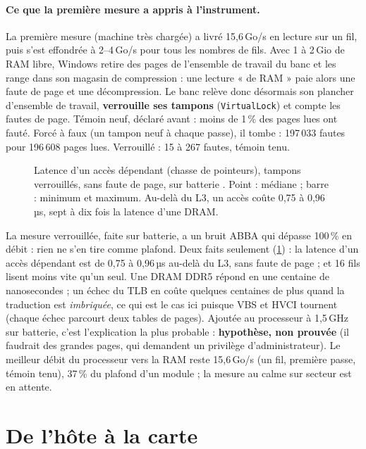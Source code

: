 \paragraph{Ce que la première mesure a appris à l'instrument.} La première mesure (machine très chargée) a livré 15,6\,Go/s en lecture sur un fil, puis s'est effondrée à 2--4\,Go/s pour tous les nombres de fils. Avec 1 à 2\,Gio de RAM libre, Windows retire des pages de l'ensemble de travail du banc et les range dans son magasin de compression : une lecture « de RAM » paie alors une faute de page et une décompression. Le banc relève donc désormais son plancher d'ensemble de travail, \textbf{verrouille ses tampons} (\texttt{VirtualLock}) et compte les fautes de page. Témoin neuf, déclaré avant : moins de 1\,\% des pages lues ont fauté. Forcé à faux (un tampon neuf à chaque passe), il tombe : 197\,033 fautes pour 196\,608 pages lues. Verrouillé : 15 à 267 fautes, témoin tenu.

\begin{figure}[ht]
\centering
\GrapheLatence
\caption[Latence d'un accès dépendant selon la taille du tampon]{Latence d'un accès dépendant (chasse de pointeurs), tampons verrouillés, sans faute de page, sur batterie \mes. Point : médiane ; barre : minimum et maximum. Au-delà du L3, un accès coûte 0,75 à 0,96\,µs, sept à dix fois la latence d'une DRAM.}
\label{fig:latence}
\end{figure}

La mesure verrouillée, faite sur batterie, a un bruit ABBA qui dépasse 100\,\% en débit : rien ne s'en tire comme plafond. Deux faits seulement (\cref{fig:latence}) : la latence d'un accès dépendant est de 0,75 à 0,96\,µs au-delà du L3, sans faute de page ; et 16 fils lisent moins vite qu'un seul. Une DRAM DDR5 répond en une centaine de nanosecondes ; un échec du TLB en coûte quelques centaines de plus quand la traduction est \emph{imbriquée}, ce qui est le cas ici puisque VBS et HVCI tournent (chaque échec parcourt deux tables de pages). Ajoutée au processeur à 1,5\,GHz sur batterie, c'est l'explication la plus probable : \textbf{hypothèse, non prouvée} (il faudrait des grandes pages, qui demandent un privilège d'administrateur). Le meilleur débit du processeur vers la RAM reste 15,6\,Go/s (un fil, première passe, témoin tenu), 37\,\% du plafond d'un module ; la mesure au calme sur secteur est en attente.

\section{De l'hôte à la carte}\label{sec:pcie}

